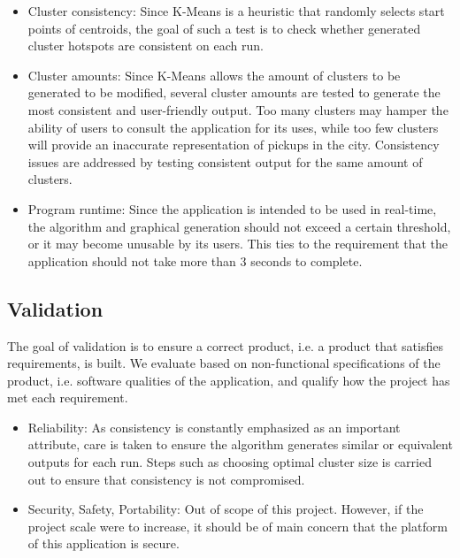 \documentclass[12pt]{article}
\begin{document}
\begin{itemize}
\item Cluster consistency: Since K-Means is a heuristic that randomly selects start points of centroids,
the goal of such a test is to check whether generated cluster hotspots are consistent on each run.
\item Cluster amounts: Since K-Means allows the amount of clusters to be generated to be modified,
several cluster amounts are tested to generate the most consistent and user-friendly output. Too many
clusters may hamper the ability of users to consult the application for its uses, while too few clusters
will provide an inaccurate representation of pickups in the city. Consistency issues are addressed by
testing consistent output for the same amount of clusters.
\item Program runtime: Since the application is intended to be used in real-time, the algorithm and graphical
generation should not exceed a certain threshold, or it may become unusable by its users. This ties to
the requirement that the application should not take more than 3 seconds to complete.
\end{itemize}

\newpage

\subsection {Validation}
The goal of validation is to ensure a correct product, i.e. a product that satisfies requirements, is built.
We evaluate based on non-functional specifications of the product, i.e. software qualities of the
application, and qualify how the project has met each requirement.
\begin{itemize}
\item Reliability: As consistency is constantly emphasized as an important attribute, care is taken
to ensure the algorithm generates similar or equivalent outputs for each run. Steps such as choosing
optimal cluster size is carried out to ensure that consistency is not compromised.
\item Security, Safety, Portability: Out of scope of this project. However, 
if the project scale were to increase, it should be of main concern that the
 platform of this application is secure.
\end{itemize}
\end{document}
